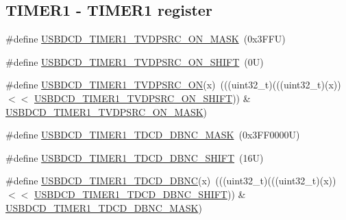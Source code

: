 \subsection*{T\+I\+M\+E\+R1 -\/ T\+I\+M\+E\+R1 register}
\begin{DoxyCompactItemize}
\item 
\#define \mbox{\hyperlink{group___u_s_b_d_c_d___register___masks_ga92a3ff207a03a829c52722ee439a6e2a}{U\+S\+B\+D\+C\+D\+\_\+\+T\+I\+M\+E\+R1\+\_\+\+T\+V\+D\+P\+S\+R\+C\+\_\+\+O\+N\+\_\+\+M\+A\+SK}}~(0x3\+F\+F\+U)
\item 
\#define \mbox{\hyperlink{group___u_s_b_d_c_d___register___masks_gaf618094ca6122f71185c4152a74ab1e3}{U\+S\+B\+D\+C\+D\+\_\+\+T\+I\+M\+E\+R1\+\_\+\+T\+V\+D\+P\+S\+R\+C\+\_\+\+O\+N\+\_\+\+S\+H\+I\+FT}}~(0\+U)
\item 
\#define \mbox{\hyperlink{group___u_s_b_d_c_d___register___masks_ga1a9a39c864450fac6194594af36b0aaf}{U\+S\+B\+D\+C\+D\+\_\+\+T\+I\+M\+E\+R1\+\_\+\+T\+V\+D\+P\+S\+R\+C\+\_\+\+ON}}(x)~(((uint32\+\_\+t)(((uint32\+\_\+t)(x)) $<$$<$ \mbox{\hyperlink{group___u_s_b_d_c_d___register___masks_gaf618094ca6122f71185c4152a74ab1e3}{U\+S\+B\+D\+C\+D\+\_\+\+T\+I\+M\+E\+R1\+\_\+\+T\+V\+D\+P\+S\+R\+C\+\_\+\+O\+N\+\_\+\+S\+H\+I\+FT}})) \& \mbox{\hyperlink{group___u_s_b_d_c_d___register___masks_ga92a3ff207a03a829c52722ee439a6e2a}{U\+S\+B\+D\+C\+D\+\_\+\+T\+I\+M\+E\+R1\+\_\+\+T\+V\+D\+P\+S\+R\+C\+\_\+\+O\+N\+\_\+\+M\+A\+SK}})
\item 
\#define \mbox{\hyperlink{group___u_s_b_d_c_d___register___masks_gaa9effc48a7e8a226b8624dc08d85d704}{U\+S\+B\+D\+C\+D\+\_\+\+T\+I\+M\+E\+R1\+\_\+\+T\+D\+C\+D\+\_\+\+D\+B\+N\+C\+\_\+\+M\+A\+SK}}~(0x3\+F\+F0000\+U)
\item 
\#define \mbox{\hyperlink{group___u_s_b_d_c_d___register___masks_ga5c3ffaffcc961857121e8ecf9692c70c}{U\+S\+B\+D\+C\+D\+\_\+\+T\+I\+M\+E\+R1\+\_\+\+T\+D\+C\+D\+\_\+\+D\+B\+N\+C\+\_\+\+S\+H\+I\+FT}}~(16\+U)
\item 
\#define \mbox{\hyperlink{group___u_s_b_d_c_d___register___masks_ga1aa87b0c873931aac928ad346f49729d}{U\+S\+B\+D\+C\+D\+\_\+\+T\+I\+M\+E\+R1\+\_\+\+T\+D\+C\+D\+\_\+\+D\+B\+NC}}(x)~(((uint32\+\_\+t)(((uint32\+\_\+t)(x)) $<$$<$ \mbox{\hyperlink{group___u_s_b_d_c_d___register___masks_ga5c3ffaffcc961857121e8ecf9692c70c}{U\+S\+B\+D\+C\+D\+\_\+\+T\+I\+M\+E\+R1\+\_\+\+T\+D\+C\+D\+\_\+\+D\+B\+N\+C\+\_\+\+S\+H\+I\+FT}})) \& \mbox{\hyperlink{group___u_s_b_d_c_d___register___masks_gaa9effc48a7e8a226b8624dc08d85d704}{U\+S\+B\+D\+C\+D\+\_\+\+T\+I\+M\+E\+R1\+\_\+\+T\+D\+C\+D\+\_\+\+D\+B\+N\+C\+\_\+\+M\+A\+SK}})
\end{DoxyCompactItemize}
